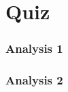 \documentclass[12pt]{article}
\begin{document}
\part{Quiz}
\section{Analysis 1}

\section{Analysis 2}

\end{document}

